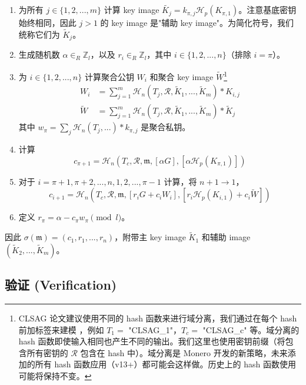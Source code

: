 \begin{enumerate}
	\item 为所有 \(j \in \{1, 2, ..., m\}\) 计算 key image \(\tilde{K_j} = k_{\pi, j} \mathcal{H}_p(K_{\pi, 1})\)。注意基底密钥始终相同，因此 $j>1$ 的 key image 是"辅助 key image"。为简化符号，我们统称它们为 $\tilde{K}_j$。

	\item 生成随机数 \(\alpha \in_R \mathbb{Z}_l\)，以及 \(r_{i} \in_R \mathbb{Z}_l\)，其中 \(i \in \{1, 2, ..., n\}\)（排除 \(i = \pi\)）。

    \item 为 \(i \in \{1, 2, ..., n\}\) 计算聚合公钥 $W_i$ 和聚合 key image $\tilde{W}$\footnote{CLSAG 论文建议使用不同的 hash 函数来进行域分离，我们通过在每个 hash 前加标签来建模 \cite{MRL-0011-CLSAG}，例如 $T_1 =$ "CLSAG\_1"，$T_c =$ "CLSAG\_c" 等。域分离的 hash 函数即使输入相同也产生不同的输出。我们这里也使用密钥前缀（将包含所有密钥的 $\mathcal{R}$ 包含在 hash 中）。域分离是 Monero 开发的新策略，未来添加的所有 hash 函数应用（v13+）都可能会这样做。历史上的 hash 函数使用可能将保持不变。}%
    \begin{align*}
    W_i &= \sum^{m}_{j=1} \mathcal{H}_n(T_j, \mathcal{R}, \tilde{K}_1,...,\tilde{K}_{m})*K_{i,j}\\
    \tilde{W} &= \sum^{m}_{j=1} \mathcal{H}_n(T_j, \mathcal{R}, \tilde{K}_1,...,\tilde{K}_{m})*\tilde{K}_j
    \end{align*}{}
    其中 $w_{\pi} = \sum_j \mathcal{H}_n(T_j,...)*k_{\pi,j}$ 是聚合私钥。


	\item 计算
	\[c_{\pi+1} = \mathcal{H}_n(T_c, \mathcal{R}, \mathfrak{m}, [\alpha G], [\alpha \mathcal{H}_p(K_{\pi, 1})])\]

	\item 对于 \(i = \pi+1, \pi+2, ..., n, 1, 2, ..., \pi-1\) 计算，将 \(n + 1 \rightarrow 1\)，\vspace{.175cm}
	\[c_{i+1} = \mathcal{H}_n(T_c, \mathcal{R}, \mathfrak{m}, [r_i G + c_i W_i], [r_{i} \mathcal{H}_p(K_{i,1}) + c_i \tilde{W}])\]

	\item 定义 \(r_{\pi} = \alpha - c_\pi w_\pi \pmod l\)。
\end{enumerate}

因此 \(\sigma(\mathfrak{m}) = (c_1, r_1, ..., r_n) \)，附带主 key image $\tilde{K}_1$ 和辅助 image $(\tilde{K}_2,...,\tilde{K}_{m})$。


\subsection*{验证 (Verification)}

